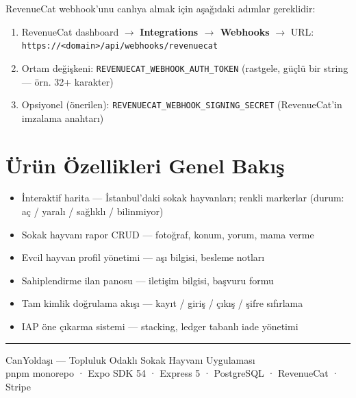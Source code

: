 \documentclass[12pt,a4paper]{article}
\begin{document}
RevenueCat webhook'unu canlıya almak için aşağıdaki adımlar gereklidir:

\begin{enumerate}[leftmargin=1.5em]
  \item RevenueCat dashboard $\rightarrow$ \textbf{Integrations $\rightarrow$ Webhooks}
        $\rightarrow$ URL: \texttt{https://\textless domain\textgreater/api/webhooks/revenuecat}
  \item Ortam değişkeni: \texttt{REVENUECAT\_WEBHOOK\_AUTH\_TOKEN}
        (rastgele, güçlü bir string — örn. 32+ karakter)
  \item Opsiyonel (önerilen): \texttt{REVENUECAT\_WEBHOOK\_SIGNING\_SECRET}
        (RevenueCat'in imzalama anahtarı)
\end{enumerate}

\section{Ürün Özellikleri Genel Bakış}

\begin{itemize}[leftmargin=1.5em]
  \item İnteraktif harita — İstanbul'daki sokak hayvanları; renkli markerlar
        (durum: aç / yaralı / sağlıklı / bilinmiyor)
  \item Sokak hayvanı rapor CRUD — fotoğraf, konum, yorum, mama verme
  \item Evcil hayvan profil yönetimi — aşı bilgisi, besleme notları
  \item Sahiplendirme ilan panosu — iletişim bilgisi, başvuru formu
  \item Tam kimlik doğrulama akışı — kayıt / giriş / çıkış / şifre sıfırlama
  \item IAP öne çıkarma sistemi — stacking, ledger tabanlı iade yönetimi
\end{itemize}

\vspace{2em}
\noindent\rule{\textwidth}{0.4pt}
\begin{center}
  \small\color{gray}
  CanYoldaşı — Topluluk Odaklı Sokak Hayvanı Uygulaması \\
  pnpm monorepo · Expo SDK 54 · Express 5 · PostgreSQL · RevenueCat · Stripe
\end{center}
\end{document}
